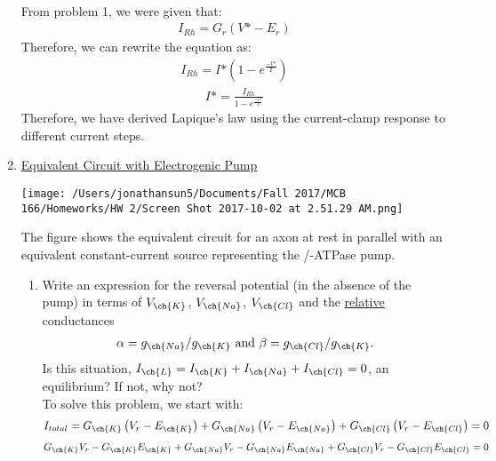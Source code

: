 \documentclass[11pt]{article}
\begin{document}
\begin{enumerate}[label=\arabic*.]
\begin{align*}
\end{align*}
From problem 1, we were given that:
\begin{align*}
I_{Rh} = G_r \left(V\text{*} - E_r\right)
\end{align*}
Therefore, we can rewrite the equation as:
\begin{align*}
I_{Rh} = I\text{*} \left(1 - e ^ {\frac{-t\text{*}} {T}}\right)
\end{align*}
\begin{align*}
I\text{*} = \frac{I_{Rh}} {1 - e ^ {\frac{-t\text{*}} {T}}}
\end{align*}
Therefore, we have derived Lapique's law using the current-clamp response to different current steps.



\newpage
\item
\underline{Equivalent Circuit with Electrogenic Pump}
\begin{center}
\texttt{[image: /Users/jonathansun5/Documents/Fall 2017/MCB 166/Homeworks/HW 2/Screen Shot 2017-10-02 at 2.51.29 AM.png]}
\end{center}
The figure shows the equivalent circuit for an axon at rest in parallel with an equivalent constant-current source representing the /-ATPase pump.
\begin{enumerate}[label=(\alph*)]
\item
Write an expression for the reversal potential (in the absence of the pump) in terms of $V_{\ch{K}}$, $V_{\ch{Na}}$, $V_{\ch{Cl}}$ and the \underline{relative} conductances
\begin{align*}
\alpha = g_{\ch{Na}} / g_{\ch{K}} \text{ and } \beta = g_{\ch{Cl}} / g_{\ch{K}}.
\end{align*}
Is this situation, $I_{\ch{L}} = I_{\ch{K}} + I_{\ch{Na}} + I_{\ch{Cl}} = 0$, an equilibrium? If not, why not?
\vspace*{1\baselineskip}
\\
To solve this problem, we start with:
\begin{align*}
I_{total} = G_{\ch{K}} \left(V_r - E_{\ch{K}}\right) + G_{\ch{Na}} \left(V_r - E_{\ch{Na}}\right) + G_{\ch{Cl}} \left(V_r - E_{\ch{Cl}}\right) = 0
\end{align*}
\begin{align*}
G_{\ch{K}} V_r - G_{\ch{K}} E_{\ch{K}} + G_{\ch{Na}} V_r - G_{\ch{Na}} E_{\ch{Na}} + G_{\ch{Cl}} V_r - G_{\ch{Cl}} E_{\ch{Cl}} = 0
\end{align*}
\begin{align*}

\end{align*}
\end{enumerate}
\end{enumerate}
\end{document}
